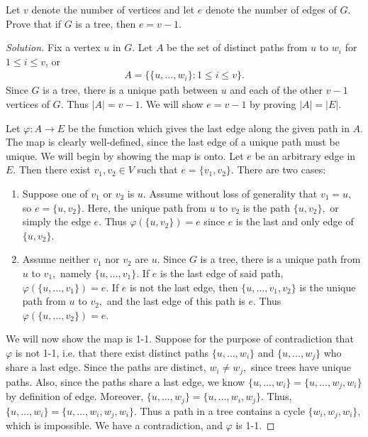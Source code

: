 \documentclass[12pt]{article}
\newenvironment{exercise}[2][Exercise]{\begin{trivlist}
        \item[\hskip \labelsep {\bfseries #1}\hskip \labelsep {\bfseries #2.}]}{\end{trivlist}}
\newenvironment{solution}
        {\begin{proof}[Solution]}
                    {\end{proof}}
\begin{document}
\begin{exercise}{52}
    Let \( v \) denote the number of vertices and let \( e \) denote the number of edges of \( G. \) Prove that if \( G \) is a tree, then \( e = v-1. \)
    \begin{solution}
        Fix a vertex \( u \) in \( G. \) Let \( A \) be the set of distinct paths from \( u \) to \( w_{i} \) for \( 1 \leq i \leq v \), or
        \begin{align*}
            A = \{\{u, \dots , w_{i}\} : 1 \leq i \leq v\} .
        \end{align*}
        Since \( G \) is a tree, there is a unique path between \( u \) and each of the other \( v-1 \) vertices of \( G. \) Thus \( \left| A \right| = v-1. \) We will show \( e = v-1 \) by proving \( \left| A \right| = \left| E \right| . \)

        Let \( \varphi : A \to E \) be the function which gives the last edge along the given path in \( A. \) The map is clearly well-defined, since the last edge of a unique path must be unique. We will begin by showing the map is onto. Let \( e \) be an arbitrary edge in \( E. \) Then there exist \( v_{1} , v_{2} \in V \) such that \( e = \{v_{1} , v_{2}\} . \) There are two cases:
        \begin{enumerate}
            \item Suppose one of \( v_{1} \) or \( v_{2} \) is \( u. \) Assume without loss of generality that \( v_{1} = u, \) so \( e = \{u, v_{2}\} . \) Here, the unique path from \( u \) to \( v_{2} \) is the path \( \{u, v_{2}\} , \) or simply the edge \( e. \) Thus \( \varphi(\{u, v_{2}\}) = e \) since \( e \) is the last and only edge of \( \{u , v_{2}\} . \)
            \item Assume neither \( v_{1} \) nor \( v_{2} \) are \( u. \) Since \( G \) is a tree, there is a unique path from \( u \) to \( v_{1} , \) namely \( \{u, \dots , v_{1} \}.  \) If \( e \) is the last edge of said path, \( \varphi(\{u , \dots , v_{1}\} ) = e \). If \( e \) is not the last edge, then \( \{u, \dots , v_{1} , v_{2}\} \) is the unique path from \( u \) to \( v_{2} , \) and the last edge of this path is \( e. \) Thus \( \varphi(\{u, \dots , v_{2}\}) = e. \)
        \end{enumerate}
        We will now show the map is 1-1. Suppose for the purpose of contradiction that \( \varphi \) is not 1-1, i.e. that there exist distinct paths \( \{u , \dots , w_{i}\} \) and \( \{u , \dots , w_{j}\} \) who share a last edge. Since the paths are distinct, \( w_{i} \neq w_{j} , \) since trees have unique paths. Also, since the paths share a last edge, we know \( \{u, \dots , w_{i}\} = \{u, \dots , w_{j} , w_{i}\} \) by definition of edge. Moreover, \( \{u, \dots , w_{j}\} = \{u, \dots , w_{i} , w_{j}\} . \) Thus, \( \{u , \dots, w_{i}\} = \{u , \dots , w_{i} , w_{j} , w_{i} \} . \) Thus a path in a tree contains a cycle \( \{w_{i} , w_{j} , w_{i}\} , \) which is impossible. We have a contradiction, and \( \varphi \) is 1-1.
    \end{solution}
\end{exercise}
\end{document}

